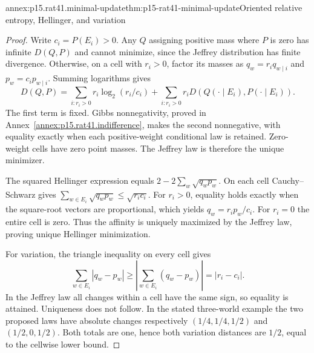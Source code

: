 \begin{annexitem}{annex:p15.rat41.minimal-update}{thm:p15-rat41-minimal-update}{Oriented relative entropy, Hellinger, and variation}
\begin{proof}
Write \(c_i=P(E_i)>0\). Any \(Q\) assigning positive mass where
\(P\) is zero has infinite \(D(Q,P)\) and cannot minimize, since
the Jeffrey distribution has finite divergence. Otherwise, on a cell
with \(r_i>0\), factor its masses as \(q_w=r_i q_{w\mid i}\)
and \(p_w=c_i p_{w\mid i}\). Summing logarithms gives
\[
 D(Q,P)=\sum_{i:r_i>0}r_i\log_2(r_i/c_i)
       +\sum_{i:r_i>0}r_i D(Q(\cdot\mid E_i),P(\cdot\mid E_i)).
\]
The first term is fixed. Gibbs nonnegativity, proved in
Annex~\ref{annex:p15.rat41.indifference}, makes the second nonnegative, with equality exactly when each
positive-weight conditional law is retained. Zero-weight cells have
zero point masses. The Jeffrey law is therefore the unique minimizer.

The squared Hellinger expression equals
\(2-2\sum_w\sqrt{q_wp_w}\). On each cell Cauchy--Schwarz gives
\(\sum_{w\in E_i}\sqrt{q_wp_w}\leq\sqrt{r_i c_i}\).
For \(r_i>0\), equality holds exactly when the square-root vectors
are proportional, which yields \(q_w=r_i p_w/c_i\). For \(r_i=0\)
the entire cell is zero. Thus the affinity is uniquely maximized by
the Jeffrey law, proving unique Hellinger minimization.

For variation, the triangle inequality on every cell gives
\[
 \sum_{w\in E_i}|q_w-p_w|
        \geq\left|\sum_{w\in E_i}(q_w-p_w)\right|=|r_i-c_i|.
\]
In the Jeffrey law all changes within a cell have the same sign,
so equality is attained. Uniqueness does not follow. In the stated
three-world example the two proposed laws have absolute changes
respectively \((1/4,1/4,1/2)\) and \((1/2,0,1/2)\). Both totals
are one, hence both variation distances are \(1/2\), equal to the
cellwise lower bound.
\end{proof}
\end{annexitem}

